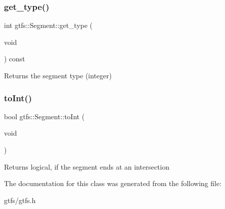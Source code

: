 \subsubsection{\texorpdfstring{get\+\_\+type()}{get\_type()}}
{\footnotesize\ttfamily int gtfs\+::\+Segment\+::get\+\_\+type (\begin{DoxyParamCaption}\item[{void}]{ }\end{DoxyParamCaption}) const\hspace{0.3cm}{\ttfamily [inline]}}

\begin{DoxyReturn}{Returns}
the segment type (integer) 
\end{DoxyReturn}
\mbox{\label{classgtfs_1_1Segment_a2b289f1a504fcd1912e588525fc46a41}} 
\subsubsection{\texorpdfstring{to\+Int()}{toInt()}}
{\footnotesize\ttfamily bool gtfs\+::\+Segment\+::to\+Int (\begin{DoxyParamCaption}\item[{void}]{ }\end{DoxyParamCaption})\hspace{0.3cm}{\ttfamily [inline]}}

\begin{DoxyReturn}{Returns}
logical, if the segment ends at an intersection 
\end{DoxyReturn}


The documentation for this class was generated from the following file\+:\begin{DoxyCompactItemize}
\item 
gtfs/gtfs.\+h\end{DoxyCompactItemize}
